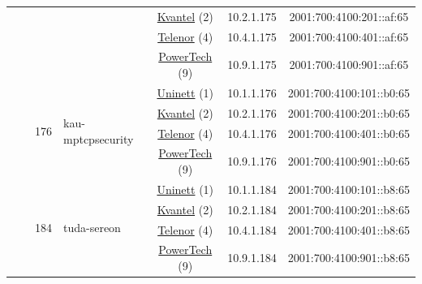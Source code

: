 \begin{small}
\begin{center}
\begin{longtable}{|c|c|c|c|c|c|c|c|}
  &  &  &  & \multicolumn{2}{|c|}{\tiny{\href{http://kvantel.no}{Kvantel} (2)}} & \tiny{10.2.1.175} & \tiny{2001:700:4100:201::af:65} \\* \cline{5-5}\cline{6-6}\cline{7-7}\cline{8-8}
  &  &  &  & \multicolumn{2}{|c|}{\tiny{\href{https://www.telenor.no}{Telenor} (4)}} & \tiny{10.4.1.175} & \tiny{2001:700:4100:401::af:65} \\* \cline{5-5}\cline{6-6}\cline{7-7}\cline{8-8}
  &  &  &  & \multicolumn{2}{|c|}{\tiny{\href{http://www.powertech.no}{PowerTech} (9)}} & \tiny{10.9.1.175} & \tiny{2001:700:4100:901::af:65} \\* \cline{3-3}\cline{4-4}\cline{5-5}\cline{6-6}\cline{7-7}\cline{8-8}
  &  & \multirow{4}{*}{\tiny{176}} & \multicolumn{1}{|l|}{\multirow{4}{*}{\tiny{kau-mptcpsecurity}}} & \multicolumn{2}{|c|}{\tiny{\href{https://www.uninett.no}{Uninett} (1)}} & \tiny{10.1.1.176} & \tiny{2001:700:4100:101::b0:65} \\* \cline{5-5}\cline{6-6}\cline{7-7}\cline{8-8}
  &  &  &  & \multicolumn{2}{|c|}{\tiny{\href{http://kvantel.no}{Kvantel} (2)}} & \tiny{10.2.1.176} & \tiny{2001:700:4100:201::b0:65} \\* \cline{5-5}\cline{6-6}\cline{7-7}\cline{8-8}
  &  &  &  & \multicolumn{2}{|c|}{\tiny{\href{https://www.telenor.no}{Telenor} (4)}} & \tiny{10.4.1.176} & \tiny{2001:700:4100:401::b0:65} \\* \cline{5-5}\cline{6-6}\cline{7-7}\cline{8-8}
  &  &  &  & \multicolumn{2}{|c|}{\tiny{\href{http://www.powertech.no}{PowerTech} (9)}} & \tiny{10.9.1.176} & \tiny{2001:700:4100:901::b0:65} \\* \cline{3-3}\cline{4-4}\cline{5-5}\cline{6-6}\cline{7-7}\cline{8-8}
  &  & \multirow{4}{*}{\tiny{184}} & \multicolumn{1}{|l|}{\multirow{4}{*}{\tiny{tuda-sereon}}} & \multicolumn{2}{|c|}{\tiny{\href{https://www.uninett.no}{Uninett} (1)}} & \tiny{10.1.1.184} & \tiny{2001:700:4100:101::b8:65} \\* \cline{5-5}\cline{6-6}\cline{7-7}\cline{8-8}
  &  &  &  & \multicolumn{2}{|c|}{\tiny{\href{http://kvantel.no}{Kvantel} (2)}} & \tiny{10.2.1.184} & \tiny{2001:700:4100:201::b8:65} \\* \cline{5-5}\cline{6-6}\cline{7-7}\cline{8-8}
  &  &  &  & \multicolumn{2}{|c|}{\tiny{\href{https://www.telenor.no}{Telenor} (4)}} & \tiny{10.4.1.184} & \tiny{2001:700:4100:401::b8:65} \\* \cline{5-5}\cline{6-6}\cline{7-7}\cline{8-8}
  &  &  &  & \multicolumn{2}{|c|}{\tiny{\href{http://www.powertech.no}{PowerTech} (9)}} & \tiny{10.9.1.184} & \tiny{2001:700:4100:901::b8:65} \\ \hline

\end{longtable}
\end{center}
\end{small}

